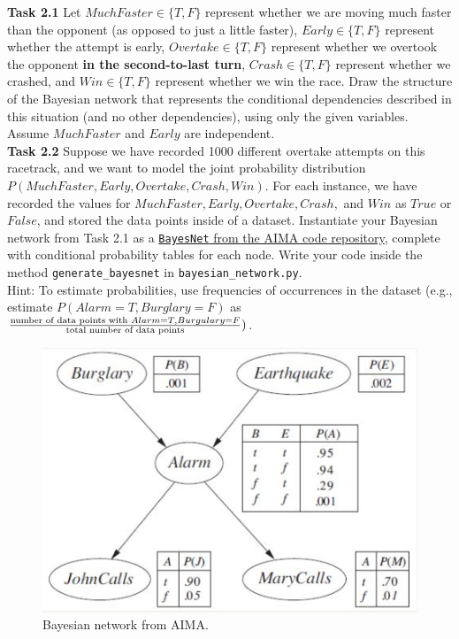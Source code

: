 \documentclass[a4paper]{article}
\begin{document}
\noindent
\textbf{Task 2.1} Let $MuchFaster\in \{T,F\}$ represent whether we are moving much faster than the opponent (as opposed to just a little faster), $Early\in \{T,F\}$ represent whether the attempt is early, $Overtake\in \{T,F\}$ represent whether we overtook the opponent \textbf{in the second-to-last turn}, $Crash\in \{T,F\}$ represent whether we crashed, and $Win\in \{T,F\}$ represent whether we win the race. Draw the structure of the Bayesian network that represents the conditional dependencies described in this situation (and no other dependencies), using only the given variables. Assume $MuchFaster$ and $Early$ are independent.\\

\noindent
\textbf{Task 2.2} Suppose we have recorded 1000 different overtake attempts on this racetrack, and we want to model the joint probability distribution $P(MuchFaster,Early,Overtake,Crash,Win)$. For each instance, we have recorded the values for $MuchFaster,Early,Overtake,Crash,$ and $Win$ as $True$ or $False$, and stored the data points inside of a dataset. Instantiate your Bayesian network from Task 2.1 as a \href{https://github.com/aimacode/aima-python/blob/master/probability.py#L164}{\texttt{BayesNet} from the AIMA code repository}, complete with conditional probability tables for each node. Write your code inside the method \texttt{generate\_bayesnet} in \texttt{bayesian\_network.py}.\\

\noindent
Hint: To estimate probabilities, use frequencies of occurrences in the dataset (e.g., estimate $P(Alarm=T,Burglary=F)$ as $\frac{\textnormal{number of data points with } Alarm=T,Burgulary=F}{\textnormal{total number of data points}})$.\\

\begin{figure}[b!]
    \centering
    \includegraphics[scale=0.47]{images/bayesnet.png}
    \caption{Bayesian network from AIMA.}
    \label{fig:burglary}
\end{figure}
\end{document}
